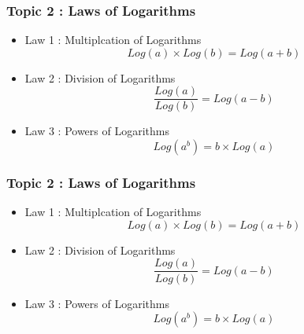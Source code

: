 \documentclass{beamer}
\begin{document}
\begin{frame}
	\frametitle{ Topic 2 : Laws of Logarithms}
	\Large
	\begin{itemize}
		\item Law 1 : Multiplcation of Logarithms
		\[ Log(a) \times Log(b) = Log(a+b) \]
		\item Law 2 : Division of Logarithms
		\[ \frac{Log(a)}{Log(b)} = Log(a-b) \]
		\item Law 3 : Powers of Logarithms
		\[ Log(a^b) = b \times Log(a) \]
	\end{itemize}
		
\end{frame}

\begin{frame}
	\frametitle{ Topic 2 : Laws of Logarithms}
	\Large
	\begin{itemize}
		\item Law 1 : Multiplcation of Logarithms
		\[ Log(a) \times Log(b) = Log(a+b) \]
		\item Law 2 : Division of Logarithms
		\[ \frac{Log(a)}{Log(b)} = Log(a-b) \]
		\item Law 3 : Powers of Logarithms
		\[ Log(a^b) = b \times Log(a) \]
	\end{itemize}
	
	
	
\end{frame}
\end{document}
